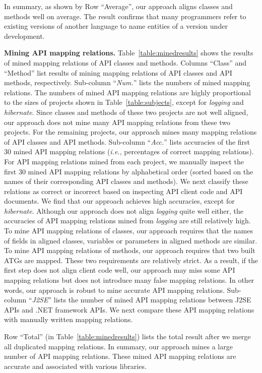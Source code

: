 In summary, as shown by Row ``Average'', our approach aligns classes and methods well on average. The result confirms that many
programmers refer to existing versions of another language to name
entities of a version under development.

\textbf{Mining API mapping relations.}
Table~\ref{table:minedresults} shows the results of mined mapping
relations of API classes and methods. Columns ``Class'' and ``Method''
list results of mining mapping relations of API classes and API methods, respectively. Sub-column
``\emph{Num.}'' lists the numbers of mined mapping relations. The
numbers of mined API mapping relations are highly proportional to the sizes
of projects shown in Table~\ref{table:subjects}, except for
\emph{logging} and \emph{hibernate}. Since classes and methods of these
two projects are not well aligned, our approach does not mine
many API mapping relations from these two projects. For the
remaining projects, our approach mines many mapping relations of API
classes and API methods. Sub-column ``\emph{Acc.}'' lists accuracies
of the first 30 mined API mapping relations (\emph{i.e.}, percentages of correct
mapping relations). For API mapping relations mined from each project, we
manually inspect the first 30 mined API mapping relations by alphabetical order
(sorted based on the names of their corresponding API classes and methods).
We next classify these relations as correct or incorrect based on inspecting API client code and
API documents. We find that our approach achieves high accuracies, except for
\emph{hibernate}. Although our approach does not align
\emph{logging} quite well either, the accuracies of API mapping relations mined from
\emph{logging} are still relatively high. To mine API mapping relations of
classes, our approach requires that the names of fields in aligned classes, variables 
or parameters in aligned methods are similar. To mine API mapping relations of methods, our
approach requires that two built ATGs are
mapped. These two requirements are relatively strict. As a result, if
the first step does not align client code well, our approach may
miss some API mapping relations but does not introduce many
false mapping relations. In other words, our approach is robust to
mine accurate API mapping relations. Sub-column ``\emph{J2SE}'' lists the number of mined
API mapping relations between J2SE APIs and .NET framework APIs. We next compare these API mapping
relations with manually written mapping relations.

Row ``Total'' (in Table~\ref{table:minedresults}) lists the total result after we merge all duplicated
mapping relations. In summary, our approach mines a large number of
API mapping relations. These mined API mapping relations are
accurate and associated with various libraries.



